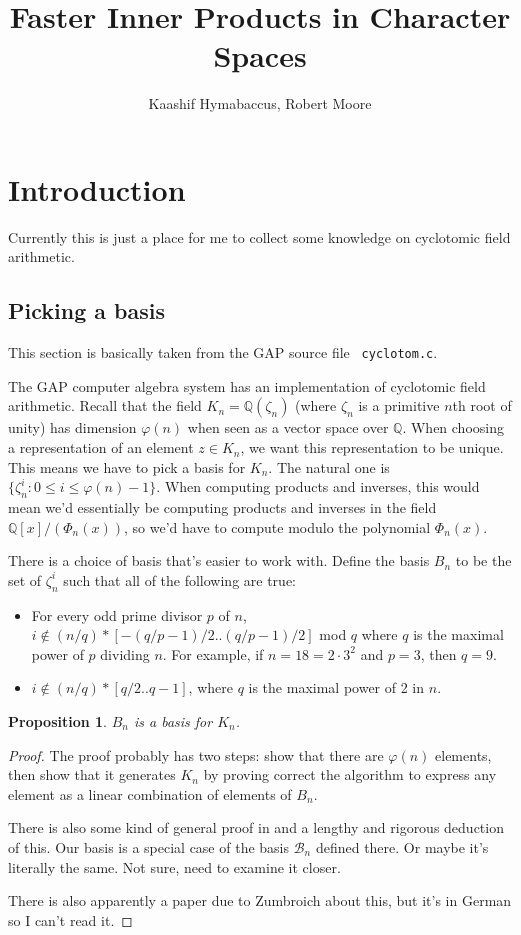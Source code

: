 \documentclass{article}
\title{Faster Inner Products in Character Spaces}
\author{Kaashif Hymabaccus, Robert Moore}
\newtheorem{prop}{Proposition}
\begin{document}
\maketitle

\section{Introduction}

Currently this is just a place for me to collect some knowledge on
cyclotomic field arithmetic.

\subsection{Picking a basis}

This section is basically taken from the GAP source file {\tt
  cyclotom.c}.

The GAP computer algebra system has an implementation of cyclotomic
field arithmetic. Recall that the field $K_n = \mathbb{Q}(\zeta_n)$
(where $\zeta_n$ is a primitive $n$th root of unity) has dimension
$\varphi(n)$ when seen as a vector space over $\mathbb{Q}$. When
choosing a representation of an element $z \in K_n$, we want this
representation to be unique. This means we have to pick a basis for
$K_n$. The natural one is
$\{ \zeta_n^i : 0 \leq i \leq \varphi(n)-1 \}$. When computing
products and inverses, this would mean we'd essentially be computing
products and inverses in the field $\mathbb{Q}[x]/(\Phi_n(x))$, so
we'd have to compute modulo the polynomial $\Phi_n(x)$.

There is a choice of basis that's easier to work with. Define the
basis $B_n$ to be the set of $\zeta_n^i$ such that all of the
following are true:

\begin{itemize}
\item For every odd prime divisor $p$ of $n$,
  $i \notin (n/q)*[-(q/p-1)/2..(q/p-1)/2]$ mod $q$ where $q$ is the
  maximal power of $p$ dividing $n$. For example, if
  $n = 18 = 2 \cdot 3^2$ and $p=3$, then $q=9$.

\item $i \notin (n/q)*[q/2..q-1]$, where $q$ is the maximal power of 2
  in $n$.
\end{itemize}

\begin{prop}
$B_n$ is a basis for $K_n$.
\end{prop}

\begin{proof}
The proof probably has two steps: show that there are $\varphi(n)$
elements, then show that it generates $K_n$ by proving correct the
algorithm to express any element as a linear combination of elements
of $B_n$.

There is also some kind of general proof in \cite{Breuer1997} and a
lengthy and rigorous deduction of this. Our basis is a special case of
the basis $\mathcal{B}_n$ defined there. Or maybe it's literally the
same. Not sure, need to examine it closer.

There is also apparently a paper due to Zumbroich about this, but it's
in German so I can't read it.
\end{proof}
\end{document}
